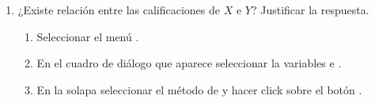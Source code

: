 \begin{enumerate}[leftmargin=*]
{\begin{enumerate}
\item ¿Existe relación entre las calificaciones de $X$ e $Y$? Justificar la respuesta.
\begin{indicacion}{
\begin{enumerate}
\item Seleccionar el menú .
\item En el cuadro de diálogo que aparece seleccionar la variables  e .
\item En la solapa  seleccionar el método de  y hacer click sobre
el botón .
\end{enumerate}}
\end{indicacion}
\end{enumerate}
}

\end{enumerate}


